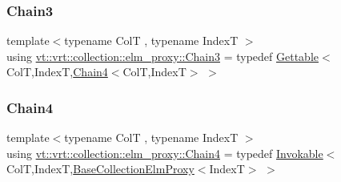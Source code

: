 \subsubsection{\texorpdfstring{Chain3}{Chain3}}
{\footnotesize\ttfamily template$<$typename ColT , typename IndexT $>$ \\
using \hyperlink{namespacevt_1_1vrt_1_1collection_1_1elm__proxy_a8db2caa0e0d4bb8dafc382c8953b2574}{vt\+::vrt\+::collection\+::elm\+\_\+proxy\+::\+Chain3} = typedef \hyperlink{structvt_1_1vrt_1_1collection_1_1_gettable}{Gettable}$<$ColT,IndexT,\hyperlink{namespacevt_1_1vrt_1_1collection_1_1elm__proxy_abfedbd295b36f2dd58c595f4f6f832f3}{Chain4}$<$ColT,IndexT$>$ $>$}

\mbox{\label{namespacevt_1_1vrt_1_1collection_1_1elm__proxy_abfedbd295b36f2dd58c595f4f6f832f3}} 
\subsubsection{\texorpdfstring{Chain4}{Chain4}}
{\footnotesize\ttfamily template$<$typename ColT , typename IndexT $>$ \\
using \hyperlink{namespacevt_1_1vrt_1_1collection_1_1elm__proxy_abfedbd295b36f2dd58c595f4f6f832f3}{vt\+::vrt\+::collection\+::elm\+\_\+proxy\+::\+Chain4} = typedef \hyperlink{structvt_1_1vrt_1_1collection_1_1_invokable}{Invokable}$<$ColT,IndexT,\hyperlink{structvt_1_1vrt_1_1collection_1_1_base_collection_elm_proxy}{Base\+Collection\+Elm\+Proxy}$<$IndexT$>$ $>$}

